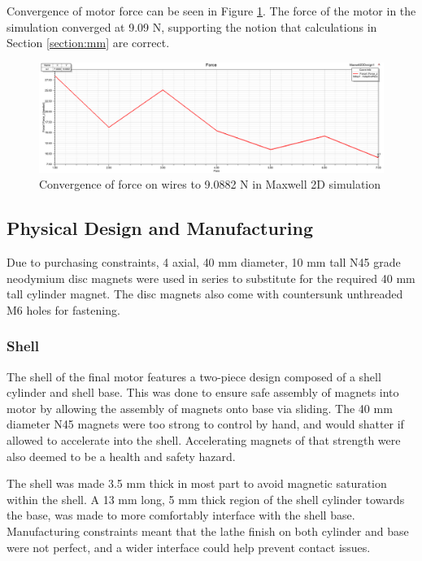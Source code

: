 \documentclass[a4paper,12pt]{article}
\begin{document}
Convergence of motor force can be seen in Figure \ref{fg:maxwellforce}. The force of the motor in the simulation converged at 9.09 N, supporting the notion that calculations in Section \ref{section:mm} are correct.

\begin{figure}[h!]
    \centering
    \includegraphics[width=\textwidth]{force.png}
    \caption{Convergence of force on wires to 9.0882 N in Maxwell 2D simulation}
    \label{fg:maxwellforce}
\end{figure}

\subsection{Physical Design and Manufacturing}

Due to purchasing constraints, 4 axial, 40 mm diameter, 10 mm tall N45 grade neodymium disc magnets were used in series to substitute for the required 40 mm tall cylinder magnet. The disc magnets also come with countersunk unthreaded M6 holes for fastening.

\subsubsection{Shell}

The shell of the final motor features a two-piece design composed of a shell cylinder and shell base. This was done to ensure safe assembly of magnets into motor by allowing the assembly of magnets onto base via sliding. The 40 mm diameter N45 magnets were too strong to control by hand, and would shatter if allowed to accelerate into the shell. Accelerating magnets of that strength were also deemed to be a health and safety hazard.

The shell was made 3.5 mm thick in most part to avoid magnetic saturation within the shell. A 13 mm long, 5 mm thick region of the shell cylinder towards the base, was made to more comfortably interface with the shell base. Manufacturing constraints meant that the lathe finish on both cylinder and base were not perfect, and a wider interface could help prevent contact issues.
\end{document}
